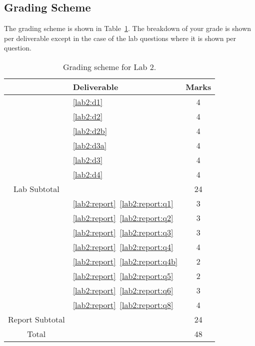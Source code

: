 \subsection{Grading Scheme}
The grading scheme is shown in Table~\ref{tab:lab2:grading}. The breakdown of
your grade is shown per deliverable except in the case of the lab
questions where it is shown per question.
%
\begin{table}
\centering
\begin{tabular}{c|l|c}
        & Deliverable           & Marks  \\ \hline
        & \ref{lab2:d1}         & 4       \\ \hline
        & \ref{lab2:d2}         & 4       \\ \hline
        & \ref{lab2:d2b}        & 4       \\ \hline
        & \ref{lab2:d3a}        & 4       \\ \hline
        & \ref{lab2:d3}         & 4       \\ \hline
        & \ref{lab2:d4}         & 4       \\ \hhline{=|=|=}
Lab Subtotal&                       & 24      \\ \hhline{=|=|=}
        & \ref{lab2:report}~\ref{lab2:report:q1}  & 3       \\ \hline
        & \ref{lab2:report}~\ref{lab2:report:q2}  & 3       \\ \hline
        & \ref{lab2:report}~\ref{lab2:report:q3}  & 3       \\ \hline
        & \ref{lab2:report}~\ref{lab2:report:q4}  & 4       \\ \hline
        & \ref{lab2:report}~\ref{lab2:report:q4b} & 2       \\ \hline
        & \ref{lab2:report}~\ref{lab2:report:q5}  & 2      \\ \hline
        & \ref{lab2:report}~\ref{lab2:report:q6}  & 3      \\ \hline
        & \ref{lab2:report}~\ref{lab2:report:q8}  & 4       \\ \hhline{=|=|=}
Report Subtotal&  & 24 \\ \hhline{=|=|=}
  Total &                       & 48
\end{tabular}
\caption[Grading Scheme for Lab 2]{Grading scheme for Lab 2.}
\label{tab:lab2:grading}
\end{table}
%
